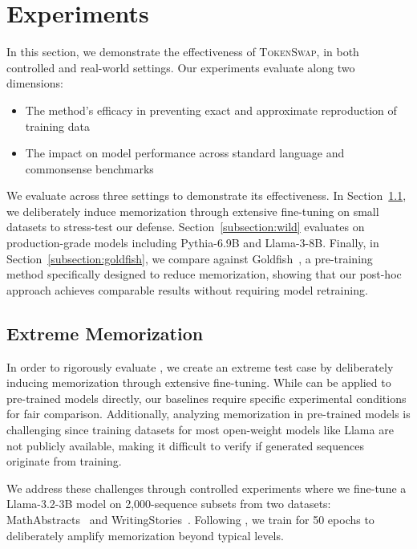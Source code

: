 

\section{Experiments}


\label{section:experiments}
In this section, we demonstrate the effectiveness of \textsc{TokenSwap}, in both controlled and real-world settings. Our experiments evaluate \sys along two dimensions:
\begin{itemize}
    \item The method's efficacy in preventing exact and approximate reproduction of training data
    \item The impact on model performance across standard language and commonsense benchmarks
\end{itemize}

We evaluate \sys across three settings to demonstrate its effectiveness. In Section~\ref{subsection:finetuning}, we deliberately induce memorization through extensive fine-tuning on small datasets to stress-test our defense. Section~\ref{subsection:wild} evaluates \sys on production-grade models including Pythia-6.9B and Llama-3-8B. Finally, in Section~\ref{subsection:goldfish}, we compare against Goldfish~\citep{hans2024like}, a pre-training method specifically designed to reduce memorization, showing that our post-hoc approach achieves comparable results without requiring model retraining.
\subsection{Extreme Memorization}
\label{subsection:finetuning}

In order to rigorously evaluate \sys, we create an extreme test case by deliberately inducing memorization through extensive fine-tuning. While \sys can be applied to pre-trained models directly, our baselines require specific experimental conditions for fair comparison. Additionally, analyzing memorization in pre-trained models is challenging since training datasets for most open-weight models like Llama are not publicly available, making it difficult to verify if generated sequences originate from training.

We address these challenges through controlled experiments where we fine-tune a Llama-3.2-3B model \citep{dubey2024llama} on 2,000-sequence subsets from two datasets: MathAbstracts~\citep{zhang2024autonomous} and WritingStories~\citep{fan2018hierarchical}. Following \citet{abad2024copyright}, we train for 50 epochs to deliberately amplify memorization beyond typical levels.

